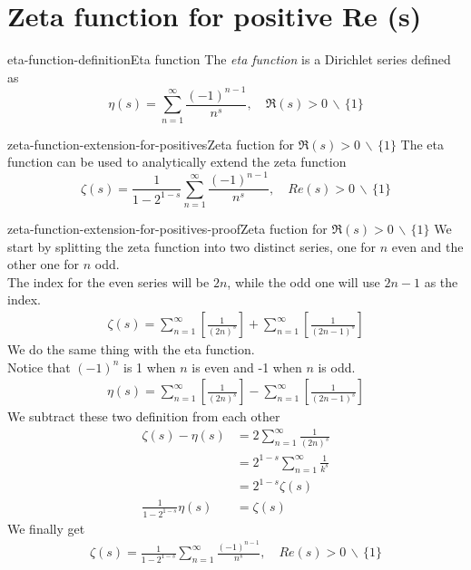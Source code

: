 \documentclass[preview]{standalone}
\newcommand{\exceptone}{
    \,\backslash\,\{1\}
}
\begin{document}
\genpage

\section{Zeta function for positive Re (s)}

\begin{snippetdefinition}{eta-function-definition}{Eta function}
    The \textit{eta function} is a Dirichlet series defined as
    \[
        \eta(s)=\sum_{n=1}^{\infty}\frac{{(-1)}^{n-1}}{n^s},
        \quad \Re(s)>0\exceptone
    \]
\end{snippetdefinition}

\begin{snippettheorem}{zeta-function-extension-for-positives}{Zeta fuction for \(\Re(s) > 0 \exceptone\)}
    The eta function can be used to analytically extend the zeta function
    \[
        \zeta(s)=\frac{1}{1-2^{1-s}}\sum_{n=1}^{\infty}\frac{{(-1)}^{n-1}}{n^s},
        \quad Re(s)>0\exceptone
    \]
\end{snippettheorem}

\begin{snippetproof}{zeta-function-extension-for-positives-proof}{Zeta fuction for \(\Re(s) > 0 \exceptone\)}
    We start by splitting the zeta function into two distinct series, one for \(n\) even and the other one for \(n\) odd.
    \\
    The index for the even series will be \(2n\), while the odd one will use \(2n-1\) as the index.
    \begin{align*}
        \zeta(s)=
        \sum_{n=1}^{\infty}\left[\frac{1}{{(2n)}^s}\right]+
        \sum_{n=1}^{\infty}\left[\frac{1}{{(2n-1)}^s}\right]
    \end{align*}
    We do the same thing with the eta function.
    \\
    Notice that \({(-1)}^n\) is 1 when \(n\) is even and -1 when \(n\) is odd.
    \begin{align*}
        \eta(s)=
        \sum_{n=1}^{\infty}\left[\frac{1}{{(2n)}^s}\right]-
        \sum_{n=1}^{\infty}\left[\frac{1}{{(2n-1)}^s}\right]
    \end{align*}
    We subtract these two definition from each other
    \begin{align*}
        \zeta(s)-\eta(s)&=
        2\sum_{n=1}^{\infty}\frac{1}{{(2n)}^s}
        \\
        &=2^{1-s}\sum_{n=1}^{\infty}\frac{1}{k^s}
        \\
        &=2^{1-s}\zeta(s)
        \\
        \frac{1}{1-2^{1-s}}\eta(s)&=\zeta(s)
    \end{align*}
    We finally get
    \begin{align*}
        \zeta(s)=\frac{1}{1-2^{1-s}}\sum_{n=1}^{\infty}\frac{{(-1)}^{n-1}}{n^s},
        \quad Re(s)>0\exceptone
    \end{align*}
\end{snippetproof}
\end{document}
